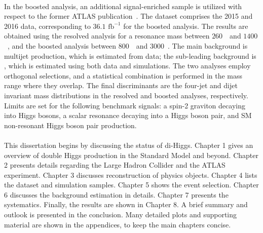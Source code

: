 \paragraph{}
In the boosted analysis, an additional signal-enriched sample is utilized with respect to the former ATLAS publication~\cite{EXOT-2015-11}. 
The dataset comprises the 2015 and 2016 data, corresponding to $36.1$ $\mathrm{fb}^{-1}$ for the boosted analysis. 
The results are obtained using the resolved analysis for a resonance mass between $260$~\GeV\ and $1400$~\GeV, and the boosted analysis between $800$~\GeV\ and $3000$~\GeV. 
The main background is multijet production, which is estimated from data; the sub-leading background is \ttbar, which is estimated using both data and simulations. 
The two analyses employ orthogonal selections, and a statistical combination is performed in the mass range where they overlap. 
The final discriminants are the four-jet and dijet invariant mass distributions in the resolved and boosted analyses, respectively. 
Limits are set for the following benchmark signals: a spin-2 graviton decaying into Higgs bosons, a scalar resonance decaying into a Higgs boson pair, and SM non-resonant Higgs boson pair production.

\paragraph{}
This dissertation begins by discussing the status of di-Higgs. 
Chapter 1 gives an overview of double Higgs production in the Standard Model and beyond. 
Chapter 2 presents details regarding the Large Hadron Collider and the ATLAS experiment. 
Chapter 3 discusses reconstruction of physics objects. 
Chapter 4 lists the dataset and simulation samples. 
Chapter 5 shows the event selection.
Chapter 6 discusses the background estimation in details.
Chapter 7 presents the systematics.
Finally, the results are shown in Chapter 8.
A brief summary and outlook is presented in the conclusion.
Many detailed plots and supporting material are shown in the appendices, to keep the main chapters concise.


